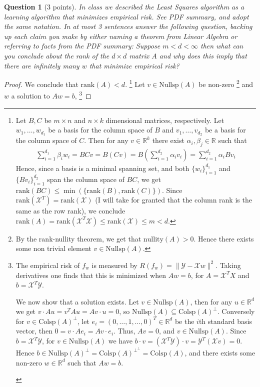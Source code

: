 \documentclass[12pt]{article}
\newcommand{\real}{\mathbb{R}}
\newcommand\set[1]{\{#1\}}
\newcommand\nullity{\text{nullity}}
\newcommand{\norm}[1]{\lVert #1 \rVert}
\newcommand{\X}{\mathcal{X}}
\newcommand{\Y}{\mathcal{Y}}
\newcommand{\colsp}{\text{Colsp}}
\newcommand{\nullsp}{\text{Nullsp}}
\newcommand{\rk}{\text{rank}}
\newtheorem{question}{Question}
\begin{document}
\begin{question}[3 points]
  In class we described the Least Squares algorithm as a learning algorithm that minimizes empirical risk.
  See PDF summary, and adopt the same notation. In at most 3 sentences answer the following question, backing up each claim you make by either naming a theorem from Linear Algebra or referring to facts from the PDF summary: Suppose $m < d < \infty$ then what can you conclude about the rank of the $d \times d$ matrix $A$ and why does this imply that there are infinitely many $w$ that minimize empirical risk? 
\end{question}
\begin{proof}

  We conclude that $\rk(A) < d$.
  \footnote{Let $B, C$ be $m \times n$ and $n \times k$ dimensional matrices, respectively. Let $w_1, \dots, w_{d_1}$ be a basis for the column space of $B$ and $v_1, \dots, v_{d_2}$ be a basis for the column space of $C$. Then for any $v \in \real^k$ there exist $\alpha_i, \beta_j \in \real$ such that
  \begin{align*}
   \sum\limits_{i=1}^{d_1}\beta_iw_i = BCv = B(Cv) =  B(\sum\limits_{i=1}^{d_2}\alpha_iv_i) = \sum\limits_{i=1}^{d_2}\alpha_iBv_i 
  \end{align*}
  Hence, since a basis is a minimal spanning set, and both $\set{w_i}_{i=1}^{d_1}$ and $\set{Bv_i}_{i=1}^{d_2}$  span the column space of $BC$, we get $\rk(BC) \leq \min(\set{\rk(B), \rk(C)})$. Since $\rk(\X^T) = \rk(\X)$ (I will take for granted that the column rank is the same as the row rank), we conclude $\rk(A) = \rk(\X^T\X) \leq \rk(\X) \leq m < d$.
  }
  Let $v \in \nullsp(A)$ be non-zero
  \footnote{
  By the rank-nullity theorem, we get that $\nullity(A)>0$. Hence there exists some non trivial element $ v \in \nullsp(A)$.
  }
  and $w$ a solution to $Aw=b$,
  \footnote{
  The empirical risk of $f_w$ is measured by $R(f_w) = \norm{\Y - \X w}^2$. Taking derivatives one finds that this is minimized when $Aw=b$, for $A=\X^T X$ and $b=\X^T \Y$. \\
  \begin{indent}
    We now show that a solution exists. Let $v \in \nullsp(A)$, then for any $u \in \real^d$ we get $v \cdot Au = v^T A u = Av \cdot u = 0$, so $\nullsp(A) \subseteq \colsp(A)^{\perp}$. Conversely for $v \in \colsp(A)^{\perp}$, let $e_i =(0, \dots, 1, \dots, 0)^T \in \real^d$ be the $i$th standard basis vector, then $0 = v \cdot Ae_i = Av \cdot e_i$. Thus, $Av = 0$, and $v \in \nullsp(A)$. Since $b=\X^T\Y$, for $v \in \nullsp(A)$ we have $b \cdot v = (\X^T \Y) \cdot v = \Y^T (\X v) = 0$. Hence $b \in \nullsp(A)^{\perp} = \colsp(A)^{\perp^\perp} = \colsp(A)$, and there exists some non-zero $w \in \real^d$ such that $Aw = b$.

\end{indent}}
\end{proof}
\end{document}
